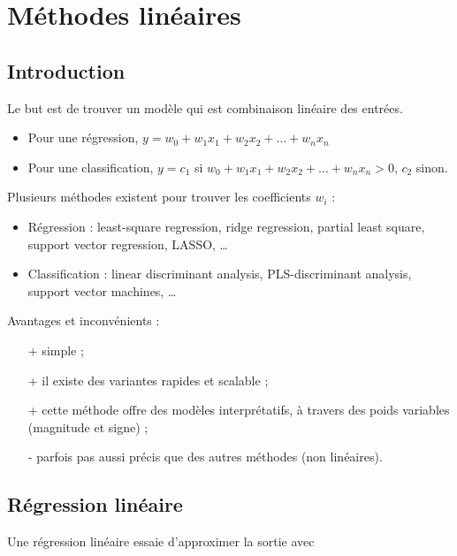\chapter{Méthodes linéaires}

	\section{Introduction}
	Le but est de trouver un modèle qui est combinaison linéaire des entrées.

	\begin{itemize}
		\item Pour une régression, $y = w_0 + w_1 x_1 + w_2 x_2 + \dots + w_n x_n$
		\item Pour une classification, $y = c_1$ si $w_0 + w_1 x_1 + w_2 x_2 + \dots + w_n x_n > 0$, $c_2$ sinon.
	\end{itemize}


	Plusieurs méthodes existent pour trouver les coefficients $w_i$ : 

	\begin{itemize}
		\item Régression : least-square regression, ridge regression, partial least square, support vector regression, LASSO, \dots
		\item Classification : linear discriminant analysis, PLS-discriminant analysis, support vector machines, \dots \\
	\end{itemize} 

	Avantages et inconvénients :
	
	\begin{itemize}
		\item[+] simple ;
		\item[+] il existe des variantes rapides et scalable ;
		\item[+] cette méthode offre des modèles interprétatifs, à travers des poids variables (magnitude et signe) ;
		\item[-] parfois pas aussi précis que des autres méthodes (non linéaires).
	\end{itemize}

	\section{Régression linéaire}
	
	Une régression linéaire essaie d'approximer la sortie avec
	
